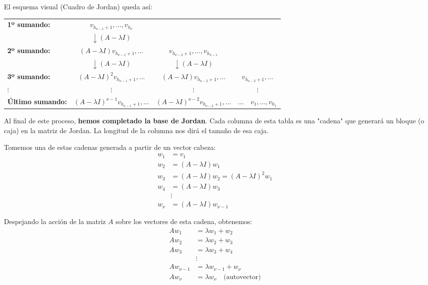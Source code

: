 El esquema visual (Cuadro de Jordan) queda así:

\begin{center}
\renewcommand{\arraystretch}{1.8}
\begin{tabular}{l c c c}
\textbf{1º sumando:} & $v_{h_{\nu-1}+1}, \dots, v_{h_\nu}$ & & \\
& $\downarrow \scriptstyle{(A-\lambda I)}$ & & \\
\textbf{2º sumando:} & $(A-\lambda I)v_{h_{\nu-1}+1}, \dots$ & $v_{h_{\nu-2}+1}, \dots, v_{h_{\nu-1}}$ & \\
& $\downarrow \scriptstyle{(A-\lambda I)}$ & $\downarrow \scriptstyle{(A-\lambda I)}$ & \\
\textbf{3º sumando:} & $(A-\lambda I)^2 v_{h_{\nu-1}+1}, \dots$ & $(A-\lambda I)v_{h_{\nu-2}+1}, \dots$ & $v_{h_{\nu-3}+1}, \dots$ \\
$\vdots$ & $\vdots$ & $\vdots$ & $\vdots$ \\
\textbf{Último sumando:} & $(A-\lambda I)^{\nu-1}v_{h_{\nu-1}+1}, \dots$ & $(A-\lambda I)^{\nu-2}v_{h_{\nu-2}+1}, \dots$ & $\dots \quad v_1, \dots, v_{h_1}$
\end{tabular}
\end{center}

Al final de este proceso, \textbf{hemos completado la base de Jordan}. Cada columna de esta tabla es una "cadena" que generará un bloque (o caja) en la matriz de Jordan. La longitud de la columna nos dirá el tamaño de esa caja.

Tomemos una de estas cadenas generada a partir de un vector cabeza:
\begin{align*}
    w_1 &= v_1 \\
    w_2 &= (A-\lambda I)w_1 \\
    w_3 &= (A-\lambda I)w_2 = (A-\lambda I)^2 w_1 \\
    w_4 &= (A-\lambda I)w_3 \\
    &\vdots \\
    w_\nu &= (A-\lambda I)w_{\nu-1}
\end{align*}

Despejando la acción de la matriz $A$ sobre los vectores de esta cadena, obtenemos:
\begin{align*}
    A w_1 &= \lambda w_1 + w_2 \\
    A w_2 &= \lambda w_2 + w_3 \\
    A w_3 &= \lambda w_3 + w_4 \\
    &\vdots \\
    A w_{\nu-1} &= \lambda w_{\nu-1} + w_\nu \\
    A w_\nu &= \lambda w_\nu \quad \text{(autovector)}
\end{align*}

